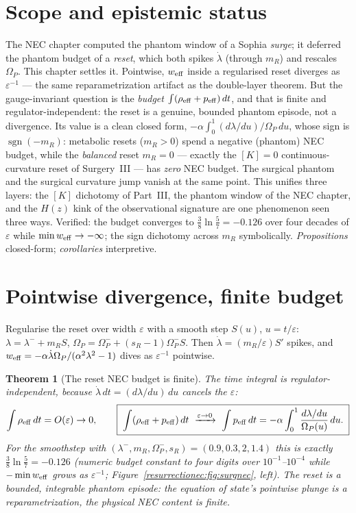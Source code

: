 \documentclass[11pt,a4paper,oneside]{book}
\newcommand{\Op}{\Omega_P}
\newcommand{\mR}{m_R}
\newcommand{\weff}{w_{\rm eff}}
\theoremstyle{plain}
\newtheorem{theorem}{Theorem}[chapter]
\theoremstyle{definition}
\theoremstyle{remark}
\begin{document}
\section*{Scope and epistemic status}
The NEC chapter computed the phantom window of a Sophia \emph{surge}; it deferred the phantom budget
of a \emph{reset}, which both spikes $\dot\lambda$ (through $\mR$) and rescales $\Op$. This chapter
settles it. Pointwise, $\weff$ inside a regularised reset diverges as $\varepsilon^{-1}$ --- the same
reparametrization artifact as the double-layer theorem. But the gauge-invariant question is the
\emph{budget} $\int(\rho_{\rm eff}+p_{\rm eff})\,dt$, and that is finite and regulator-independent:
the reset is a genuine, bounded phantom episode, not a divergence. Its value is a clean closed form,
$-\alpha\int_0^1(d\lambda/du)/\Op\,du$, whose sign is $\operatorname{sgn}(-\mR)$: metabolic resets
($\mR>0$) spend a negative (phantom) NEC budget, while the \emph{balanced} reset $\mR=0$ --- exactly
the $[K]=0$ continuous-curvature reset of Surgery~III --- has \emph{zero} NEC budget. The surgical
phantom and the surgical curvature jump vanish at the same point. This unifies three layers: the
$[K]$ dichotomy of Part~III, the phantom window of the NEC chapter, and the $H(z)$ kink of the
observational signature are one phenomenon seen three ways. Verified: the budget converges to
$\tfrac38\ln\tfrac57=-0.126$ over four decades of $\varepsilon$ while $\min\weff\to-\infty$; the sign
dichotomy across $\mR$ symbolically. \emph{Propositions} closed-form; \emph{corollaries} interpretive.

\section{Pointwise divergence, finite budget}

Regularise the reset over width $\varepsilon$ with a smooth step $S(u)$, $u=t/\varepsilon$:
$\lambda=\lambda^-+\mR S$, $\Op=\Op^-+(s_R-1)\Op^- S$. Then $\dot\lambda=(\mR/\varepsilon)S'$ spikes,
and $\weff=-\alpha\dot\lambda\Op/(\alpha^2\lambda^2-1)$ dives as $\varepsilon^{-1}$ pointwise.

\begin{theorem}[The reset NEC budget is finite]\label{resurrectionec:thm:budget}
The time integral is regulator-independent, because $\dot\lambda\,dt=(d\lambda/du)\,du$ cancels the
$\varepsilon$:
\begin{equation}
\int\rho_{\rm eff}\,dt=O(\varepsilon)\to0,
\qquad
\boxed{\;\int(\rho_{\rm eff}+p_{\rm eff})\,dt\ \xrightarrow{\varepsilon\to0}\
\int p_{\rm eff}\,dt=-\alpha\int_0^1\frac{d\lambda/du}{\Op(u)}\,du.\;}
\end{equation}
For the smoothstep with $(\lambda^-,\mR,\Op^-,s_R)=(0.9,0.3,2,1.4)$ this is exactly
$\tfrac38\ln\tfrac57=-0.126$ (numeric budget constant to four digits over $10^{-1}$--$10^{-4}$ while
$-\min\weff$ grows as $\varepsilon^{-1}$; Figure~\ref{resurrectionec:fig:surgnec}, left). The reset is a
\emph{bounded, integrable phantom episode}: the equation of state's pointwise plunge is a
reparametrization, the physical NEC content is finite.
\end{theorem}
\end{document}
